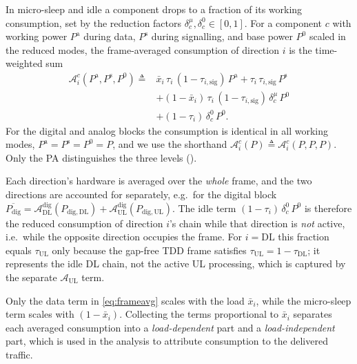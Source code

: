 In micro-sleep and idle a component drops to a fraction of its working
consumption, set by the reduction factors
$\delta^{\mu}_c,\delta^{0}_c\in[0,1]$. For a component $c$ with working power
$P^{\mathrm a}$ during data, $P^{\mathrm s}$ during signalling, and base power
$P^{0}$ scaled in the reduced modes, the frame-averaged consumption of
direction $i$ is the time-weighted sum
\begin{align}
\label{eq:frameavg}
\mathcal{A}_i^{c}\!\left(P^{\mathrm a},P^{\mathrm s},P^{0}\right) \triangleq{}&
\bar x_i\,\tau_i\,(1-\tau_{i,\mathrm{sig}})\,P^{\mathrm a}
+ \tau_i\,\tau_{i,\mathrm{sig}}\,P^{\mathrm s} \nonumber\\
&+ (1-\bar x_i)\,\tau_i\,(1-\tau_{i,\mathrm{sig}})\,\delta^{\mu}_c\,P^{0}
\nonumber\\
&+ (1-\tau_i)\,\delta^{0}_c\,P^{0} .
\end{align}
For the digital and analog blocks the consumption is identical in all working
modes, $P^{\mathrm a}=P^{\mathrm s}=P^{0}=P$, and we use the shorthand
$\mathcal{A}_i^{c}(P)\triangleq\mathcal{A}_i^{c}(P,P,P)$. Only the PA
distinguishes the three levels ().

Each direction's hardware is averaged over the \emph{whole} frame, and the two
directions are accounted for separately, e.g.\ for the digital block
$\overline{P_{\mathrm{dig}}}=\mathcal{A}_{\mathrm{DL}}^{\mathrm{dig}}(P_{\mathrm{dig,DL}})
+\mathcal{A}_{\mathrm{UL}}^{\mathrm{dig}}(P_{\mathrm{dig,UL}})$. The idle term
$(1-\tau_i)\,\delta^{0}_c\,P^{0}$ is therefore the reduced consumption of
direction $i$'s chain while that direction is \emph{not} active, i.e.\ while the
opposite direction occupies the frame. For $i=\mathrm{DL}$ this fraction equals
$\tau_{\mathrm{UL}}$ only because the gap-free TDD frame satisfies
$\tau_{\mathrm{UL}}=1-\tau_{\mathrm{DL}}$; it represents the idle DL chain, not
the active UL processing, which is captured by the separate
$\mathcal{A}_{\mathrm{UL}}$ term.

\begin{remark}
Only the data term in \eqref{eq:frameavg} scales with the load $\bar x_i$,
while the micro-sleep term scales with $(1-\bar x_i)$. Collecting the terms
proportional to $\bar x_i$ separates each averaged consumption into a
\emph{load-dependent} part and a \emph{load-independent} part, which is used in
the analysis to attribute consumption to the delivered traffic.
\end{remark}


